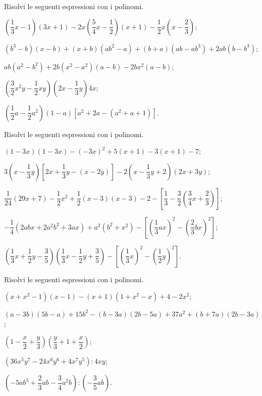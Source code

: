 \begin{esercizio}
\label{ese:11.43}
Risolvi le seguenti espressioni con i polinomi.
 \begin{enumeratea}
 \item $\left(\dfrac{1}{3}x-1\right)(3x+1)-2x\left(\dfrac{5}{4}x-\dfrac{1}{2}\right)(x+1)-\dfrac{1}{2}x\left(x-\dfrac{2}{3}\right)$;
 \item $\left(b^{3}-b\right)(x-b)+(x+b)\left(ab^{2}-a\right)+(b+a)\left(ab-ab^{3}\right)+2ab\left(b-b^{3}\right)$;
 \item $ab\left(a^{2}-b^{2}\right)+2b\left(x^{2}-a^{2}\right)(a-b)-2bx^{2}(a-b)$;
 \item $\left(\dfrac{3}{2}x^{2}y-\dfrac{1}{2}{xy}\right)\left(2x-\dfrac{1}{3}y\right)4x$;
 \item $\left(\dfrac{1}{2}a-\dfrac{1}{2}a^{2}\right)(1-a)\left[a^{2}+2a-\left(a^{2}+a+1\right)\right]$.
 \end{enumeratea}
\end{esercizio}

\begin{esercizio}
\label{ese:11.44}
Risolvi le seguenti espressioni con i polinomi.
 \begin{enumeratea}
 \item $(1-3x)(1-3x)-(-3x)^{2}+5(x+1)-3(x+1)-7$;
 \item $3\left(x-\dfrac{1}{3}y\right)\left[2x+\dfrac{1}{3}y-(x-2y)\right]-2\left(x-\dfrac{1}{3}y+2\right)(2x+3y)$;
 \item $\dfrac{1}{24}(29x+7)-\dfrac{1}{2}x^{2}+\dfrac{1}{2}(x-3)(x-3)-2-\left[\dfrac{1}{3}-\dfrac{3}{2}\left(\dfrac{3}{4}x+\dfrac{2}{3}\right)\right]$;
 \item $-{\dfrac{1}{4}}\left(2 abx+2a^{2}b^{2}+3 ax\right)+a^{2}(b^{2}+x^{2})-\left[\left(\dfrac{1}{3} ax\right)^{2}-\left(\dfrac{2}{3}bx\right)^{2}\right]$;
 \item $\left(\dfrac{1}{3}x+\dfrac{1}{2}y-\dfrac{3}{5}\right)\left(\dfrac{1}{3}x-\dfrac{1}{2}y+\dfrac{3}{5}\right)-\left[\left(\dfrac{1}{3}x\right)^{2}-\left(\dfrac{1}{2}y\right)^{2}\right]$.
 \end{enumeratea}
\end{esercizio}

\begin{esercizio}[\Ast]
\label{ese:11.45} %
Risolvi le seguenti espressioni con i polinomi.
 \begin{enumeratea}
 \item $\left(x+x^{2}-1\right)(x-1)-(x+1)\left(1+x^{2}-x\right)+4-2x^{2}$;
 \item $(a-3b)(5b-a)+15b^{2}-(b-3a)(2b-5a)+37a^{2}+(b+7a)(2b-3a)$;
 \item $\left(1-\dfrac{x}{2}+\dfrac{y}{3}\right)\left(\dfrac{y}{3}+1+\dfrac{x}{2}\right)$;
 \item $\left(36x^{5}y^{7}-24x^{6}y^{6}+4x^{7}y^{5}\right):4xy$;
 \item $\left(-5ab^{3}+\dfrac{2}{3}ab-\dfrac{3}{4}a^{2}b\right):\left(-\dfrac{3}{5}ab\right)$.
 \end{enumeratea}
\end{esercizio}

